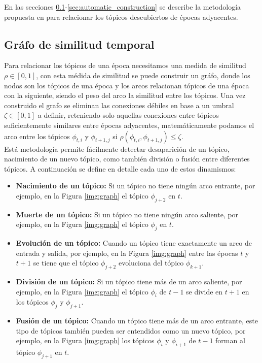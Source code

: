 \documentclass[letterpaper,12pt,oneside]{book} %
\begin{document}
En las secciones \ref{sec:similarity_graph}-\ref{sec:automatic_construction} se describe la metodología propuesta en \citep{beykikhoshk2018discovering} para relacionar los tópicos descubiertos de épocas adyacentes.

\subsection{Gráfo de similitud temporal}
\label{sec:similarity_graph}
Para relacionar los tópicos de una época necesitamos una medida de similitud $\rho \in [0,1]$, con esta médida de similitud se puede construir un gráfo, donde los nodos son los tópicos de una época y los arcos relacionan tópicos de una época con la siguiente, siendo el peso del arco la similitud entre los tópicos. Una vez construido el grafo se eliminan las conexiones débiles en base a un umbral $\zeta \in [0,1]$ a definir, reteniendo solo aquellas conexiones entre tópicos suficientemente similares entre épocas adyacentes, matemáticamente podamos el arco entre los tópicos $\phi_{t,i}$ y $\phi_{t+1,j}$ si $\rho(\phi_{t,i}, \phi_{t+1,j})\leq \zeta$.\\

Está metodología permite fácilmente detectar desaparición de un tópico, nacimiento de un nuevo tópico, como también división o fusión entre diferentes tópicos. A continuación se define en detalle cada uno de estos dinamismos:

\begin{itemize}
    \item \textbf{Nacimiento de un tópico:} Si un tópico no tiene ningún arco entrante, por ejemplo, en la Figura \ref{img:graph} el tópico $\phi_{j+2}$ en $t$.
    \item \textbf{Muerte de un tópico:} Si un tópico no tiene ningún arco saliente, por ejemplo, en la Figura \ref{img:graph} el tópico $\phi_{j}$ en $t$.
    \item \textbf{Evolución de un tópico:} Cuando un tópico tiene exactamente un arco de entrada y salida, por ejemplo, en la Figura \ref{img:graph} entre las épocas $t$ y $t+1$ se tiene que el tópico $\phi_{j+2}$ evoluciona del tópico $\phi_{k+1}$.
    \item \textbf{División de un tópico:} Si un tópico tiene más de un arco saliente, por ejemplo, en la Figura \ref{img:graph} el tópico $\phi_{i}$ de $t-1$ se divide en $t+1$ en los tópicos $\phi_{j}$ y $\phi_{j+1}$.
    \item \textbf{Fusión de un tópico:} Cuando un tópico tiene más de un arco entrante, este tipo de tópicos también pueden ser entendidos como un nuevo tópico, por ejemplo, en la Figura \ref{img:graph} los tópicos $\phi_{i}$ y $\phi_{i+1}$ de $t-1$ forman al tópico $\phi_{j+1}$ en $t$.
\end{itemize}
\end{document}
